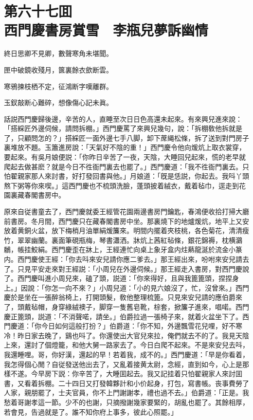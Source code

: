 
\chapter*{第六十七囬　\\西門慶書房賞雪　李瓶兒夢訴幽情}


\begin{myquote}
終日思卿不見卿，數聲寒角未堪聞。

匣中破鏡收殘月，篋裏餘衣歛断雲。

寒鴉揀枝栖不定，征鴻断字嘆離群。

玉釵敲断心難碎，想像傷心記未眞。
\end{myquote}

話説西門慶歸後邊，辛苦的人，直睡至次日日色高還未起來。有來興兒進來說：「搭綵匠外邊伺候，請問拆棚。」西門慶罵了來興兒幾句，說：「拆棚敎他拆就是了，只顧問怎的？」搭綵匠一面外邊七手八脚，卸下蓆䋲松條，拆了送到對門房子裏堆放不題。玉簫進房說：「天氣好不陰的重！」西門慶令他向煖炕上取衣裳穿，要起來。有吳月娘便説：「你昨日辛苦了一夜，天陰，大睡回兒起來，慌的老早就爬起去做甚麽？就是今日不徃衙門裏去也罷了。」西門慶道：「我不徃衙門裏去。只怕翟親家那人來討書，好打發回書與他。」月娘道：「旣是恁説，你起去。我呌丫頭熬下粥等你來喫。」這西門慶也不梳頭洗臉，蓬頭披着絨衣，戴着毡巾，逕走到花園裏藏春閣書房中。

原來自従書童去了，西門慶就委王經管花園兩邊書房門鑰匙，春鴻便收拾打掃大廳前書房。冬月間，西門慶只在藏春閣書房中坐。那裏燒下的地爐煖炕，地平上又安放着黄銅火盆，放下梅梢月油單絹煖簾來。明間内擺着夾枝桃，各色菊花，清清瘦竹，翠翠幽蘭。裏面筆硯瓶梅，琴書瀟洒。牀炕上茜紅毡條，銀花錦褥，枕横鸂鶒，帳挂鮫絹。西門慶歪在牀上，王經連忙向桌上象牙盒内炷爇龍涎於流金小篆内。西門慶使王經：「你去呌來安兒請你應二爹去。」那王經出來，吩咐來安兒請去了。只見平安走來對王經説：「小周兒在外邊伺候。」那王經走入書房，對西門慶說了。西門慶叫進小周兒來，磕了頭，説道：「你來得好，且與我篦篦頭，捏捏身上。」因說：「你怎一向不來？」小周兒道：「小的見六娘沒了，忙，沒曾來。」西門慶於是坐在一張醉翁椅上，打開頭髮，敎他整理梳篦。只見來安兒請的應伯爵來了，頭戴毡帽，身穿綠絨襖子，脚穿一隻舊皂靴，棕套，掀簾子進來，唱喏。西門慶正篦頭，説道：「不消聲喏，請坐。」伯爵拉過一張椅子來，就着火盆坐下了。西門慶道：「你今日如何這般打扮？」伯爵道：「你不知，外邊飄雪花兒哩，好不寒冷！昨日家去晚了，鷄也呌了。你還使出大官兒來拉，俺們就去不的了。我見天陰上來，還討了個燈籠，和他大舅一路家去了。今日白爬不起來。不是來安兒去呌，我還睡哩。哥，你好漢，還起的早！若着我，成不的。」西門慶道：「早是你看着，我怎得個心閒？自従發送他出去了，又亂着接黄太尉，念經，直到如今，心上是那樣不遂。今早房下説：你辛苦了，大睡囬起去。我又記挂着只怕翟親家人來討囬書，又看着拆棚。二十四日又打發韓夥計和小价起身，打包，寫書帳。丧事費勞了人家，親朋罷了，士夫官員，你不上門謝謝孝，禮也過不去。」伯爵道：「正是。我愁着哥謝孝這一節。少不的也謝，只摘撥謝幾家要緊的，胡亂也罷了。其餘相厚，若會見，告過就是了。誰不知你府上事多，彼此心照罷。」

